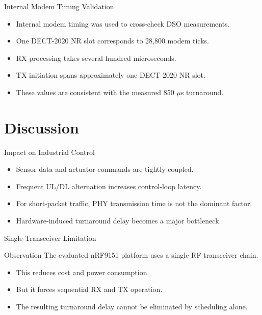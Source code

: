 \documentclass[10pt]{beamer}
\begin{document}
\begin{frame}{Internal Modem Timing Validation}
\begin{itemize}
    \item Internal modem timing was used to cross-check DSO measurements.
    \item One DECT-2020 NR slot corresponds to 28,800 modem ticks.
    \item RX processing takes several hundred microseconds.
    \item TX initiation spans approximately one DECT-2020 NR slot.
    \item These values are consistent with the measured 850 $\mu$s turnaround.
\end{itemize}
\end{frame}

\section{Discussion}

\begin{frame}{Impact on Industrial Control}
\begin{itemize}
    \item Sensor data and actuator commands are tightly coupled.
    \item Frequent UL/DL alternation increases control-loop latency.
    \item For short-packet traffic, PHY transmission time is not the dominant factor.
    \item Hardware-induced turnaround delay becomes a major bottleneck.
\end{itemize}
\end{frame}

\begin{frame}{Single-Transceiver Limitation}
\begin{block}{Observation}
The evaluated nRF9151 platform uses a single RF transceiver chain.
\end{block}

\begin{itemize}
    \item This reduces cost and power consumption.
    \item But it forces sequential RX and TX operation.
    \item The resulting turnaround delay cannot be eliminated by scheduling alone.
\end{itemize}
\end{frame}
\end{document}
